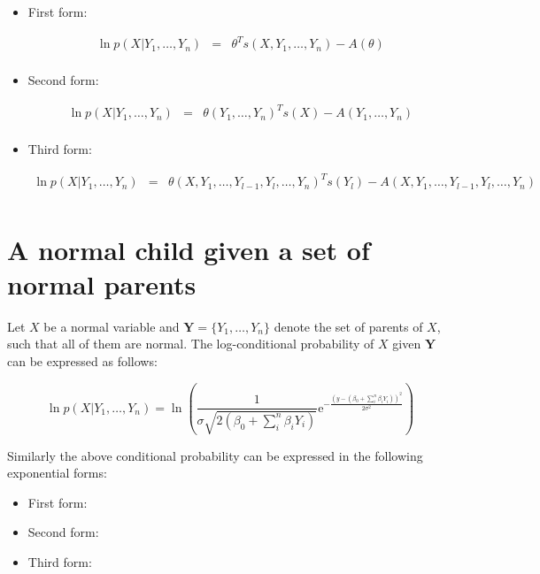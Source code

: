 \documentclass[11pt, oneside]{article}   	%
\newcommand{\me}{\mathrm{e}}
\numberwithin{figure}{section}
\numberwithin{equation}{section}
\numberwithin{table}{section}
\begin{document}
\begin{itemize}
\item First form:

\begin{eqnarray*}
\ln p(X|Y_1,\ldots ,Y_n) &=& \theta^Ts(X,Y_1,\ldots ,Y_n) - A(\theta) \\
\end{eqnarray*}

\item Second form:


\begin{eqnarray*}
\ln p(X|Y_1,\ldots ,Y_n) &=& \theta(Y_1,\ldots ,Y_n)^Ts(X) - A(Y_1,\ldots ,Y_n) \\
\end{eqnarray*}

\item Third form:

\begin{eqnarray*}
\ln p(X|Y_1,\ldots ,Y_n) &=& \theta(X, Y_1,\ldots ,Y_{l-1},Y_l, \ldots ,Y_n)^T s(Y_l) - A(X, Y_1,\ldots ,Y_{l-1},Y_l, \ldots ,Y_n) \\
\end{eqnarray*}

\end{itemize}

\newpage
\section{A normal child given a set of normal parents}

Let $X$ be a normal variable and $ \mathbf{Y} = \{Y_1,\ldots,Y_n\}$ denote the set of parents of $X$, such that all of them are normal. The log-conditional probability of $X$ given $\mathbf{Y}$ can be expressed as follows:

$$ \ln p(X|Y_1,\ldots,Y_n) = \ln \left(\frac{1}{\sigma \sqrt{2(\beta_0+\sum_i^n \beta_i Y_i )}} \me^{-\frac{(y-(\beta_0+\sum_i^n \beta_i Y_i))^2}{2\sigma^2}} \right)$$


Similarly the above conditional probability can be expressed in the following exponential forms:

\begin{itemize}
\item First form:
\item Second form:
\item Third form:
\end{itemize}
\end{document}
